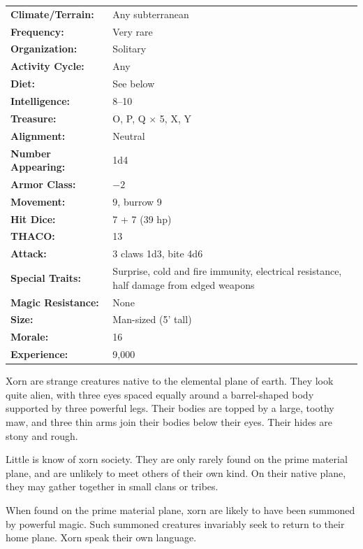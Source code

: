 \begin{multicols}{2}
\begin{minipage}{\columnwidth}
\noindent \begin{tabular}{p{}p{}}
\textbf{Climate/Terrain:}	& Any subterranean	\\
\textbf{Frequency:} 		& Very rare	\\
\textbf{Organization:} 		& Solitary	\\
\textbf{Activity Cycle:} 	& Any	\\
\textbf{Diet:} 				& See below	\\
\textbf{Intelligence:} 		& 8--10	\\
\textbf{Treasure:} 			& O, P, Q $\times$ 5, X, Y	\\
\textbf{Alignment:} 		& Neutral	\\
\hline
\textbf{Number Appearing:} 	& 1d4	\\
\textbf{Armor Class:} 		& $-2$	\\
\textbf{Movement:} 			& 9, burrow 9	\\
\textbf{Hit Dice:} 			& 7 + 7 (39 hp)	\\
\textbf{THACO:} 			& 13	\\
\textbf{Attack:} 			& 3 claws 1d3, bite 4d6	\\
\textbf{Special Traits:} & Surprise, cold and fire immunity, electrical resistance, half damage from edged weapons	\\
\textbf{Magic Resistance:} 	& None	\\
\textbf{Size:} 				& Man-sized (5' tall)	\\
\textbf{Morale:} 			& 16	\\
\textbf{Experience:} 		& 9,000	\\ %
\end{tabular}

\end{minipage}

Xorn are strange creatures native to the elemental plane of earth. They look quite alien, with three eyes spaced equally around a barrel-shaped body supported by three powerful legs. Their bodies are topped by a large, toothy maw, and three thin arms join their bodies below their eyes. Their hides are stony and rough.

Little is know of xorn society. They are only rarely found on the prime material plane, and are unlikely to meet others of their own kind. On their native plane, they may gather together in small clans or tribes.

When found on the prime material plane, xorn are likely to have been summoned by powerful magic. Such summoned creatures invariably seek to return to their home plane. Xorn speak their own language.


\end{multicols}
